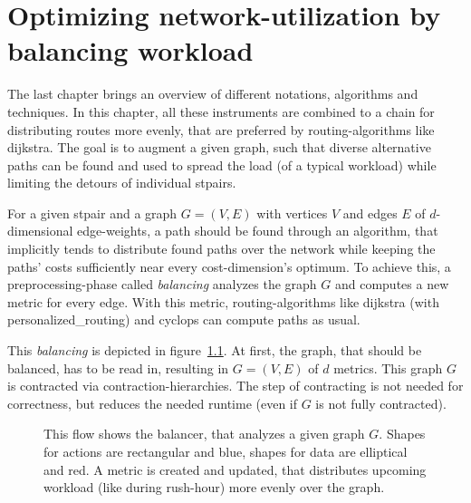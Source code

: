 \chapter{Optimizing network-utilization by balancing workload}
\label{chap:balancing}


The last chapter brings an overview of different notations, algorithms and techniques.
In this chapter, all these instruments are combined to a chain for distributing routes more evenly, that are preferred by routing-algorithms like \gls{dijkstra}.
The goal is to augment a given graph, such that diverse alternative paths can be found and used to spread the load (of a typical workload) while limiting the detours of individual \glspl{stpair}.

For a given \gls{stpair} and a graph $G = (V, E)$ with vertices $V$ and edges $E$ of $d$-dimensional edge-weights, a path should be found through an algorithm, that implicitly tends to distribute found paths over the network while keeping the paths' costs sufficiently near every cost-dimension's optimum.
To achieve this, a preprocessing-phase called \textit{balancing} analyzes the graph $G$ and computes a new metric for every edge.
With this metric, routing-algorithms like \gls{dijkstra}  (with \gls{personalized_routing}) and cyclops can compute paths as usual.

This \textit{balancing} is depicted in figure~\ref{fig:balancing}.
At first, the graph, that should be balanced, has to be read in, resulting in $G = (V, E)$ of $d$ metrics.
This graph $G$ is contracted via \gls{contraction-hierarchies}.
The step of contracting is not needed for correctness, but reduces the needed runtime (even if $G$ is not fully contracted).


\begin{figure}
    \centering
    
    \caption[Overview of balancing a graph]{%
        This flow shows the balancer, that analyzes a given graph $G$.
        Shapes for actions are rectangular and blue, shapes for data are elliptical and red.
        A metric is created and updated, that distributes upcoming workload (like during rush-hour) more evenly over the graph.
        \label{fig:balancing}
    }
\end{figure}

